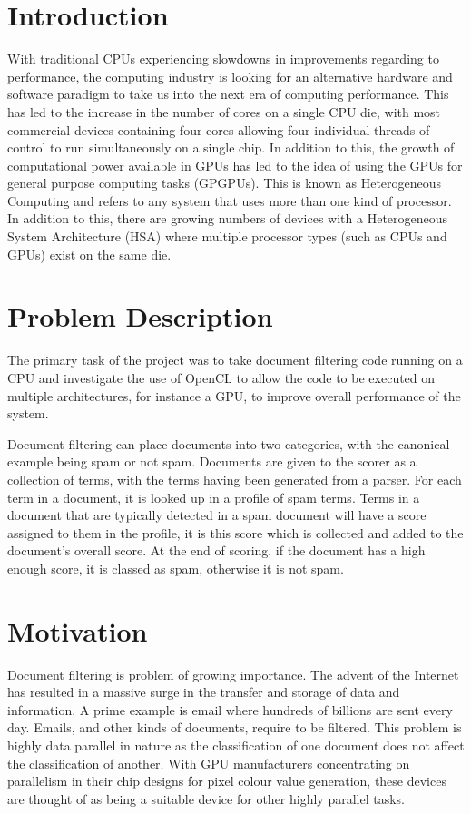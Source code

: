\section{Introduction}

With traditional CPUs experiencing slowdowns in improvements regarding to
performance, the computing industry is looking for an alternative hardware and
software paradigm to take us into the next era of computing performance. This
has led to the increase in the number of cores on a single CPU die, with most
commercial devices containing four cores allowing four individual threads of
control to run simultaneously on a single chip. In addition to this, the growth
of computational power available in GPUs has led to the idea of using the GPUs
for general purpose computing tasks (GPGPUs). This is known as Heterogeneous
Computing and refers to any system that uses more than one kind of processor. In
addition to this, there are growing numbers of devices with a Heterogeneous
System Architecture (HSA) where multiple processor types (such as CPUs and GPUs)
exist on the same die.

\section{Problem Description}

The primary task of the project was to take document filtering code running on a
CPU and investigate the use of OpenCL to allow the code to be executed on
multiple architectures, for instance a GPU, to improve overall performance of
the system.

Document filtering can place documents into two categories, with the canonical
example being spam or not spam. Documents are given to the scorer as a
collection of terms, with the terms having been generated from a parser. For
each term in a document, it is looked up in a profile of spam terms. Terms in a
document that are typically detected in a spam document will have a score
assigned to them in the profile, it is this score which is collected and added
to the document's overall score. At the end of scoring, if the document has a
high enough score, it is classed as spam, otherwise it is not spam.

\section{Motivation}

Document filtering is problem of growing importance. The advent of the Internet
has resulted in a massive surge in the transfer and storage of data and
information. A prime example is email where hundreds of billions are sent every
day. Emails, and other kinds of documents, require to be filtered. This problem
is highly data parallel in nature as the classification of one document does not
affect the classification of another. With GPU manufacturers concentrating on
parallelism in their chip designs for pixel colour value generation, these
devices are thought of as being a suitable device for other highly parallel
tasks.

